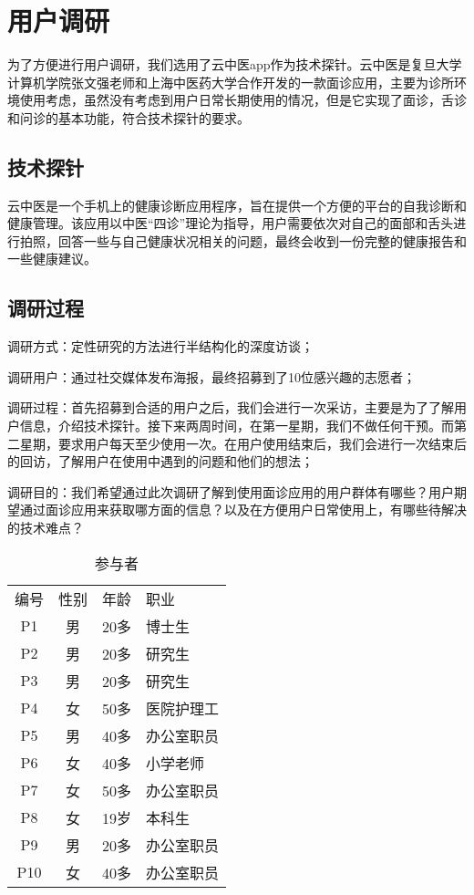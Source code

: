 \chapter{用户调研}
为了方便进行用户调研，我们选用了云中医app作为技术探针。云中医是复旦大学计算机学院张文强老师和上海中医药大学合作开发的一款面诊应用，主要为诊所环境使用考虑，虽然没有考虑到用户日常长期使用的情况，但是它实现了面诊，舌诊和问诊的基本功能，符合技术探针的要求。

\section{技术探针}
云中医是一个手机上的健康诊断应用程序，旨在提供一个方便的平台的自我诊断和健康管理。该应用以中医“四诊”理论为指导，用户需要依次对自己的面部和舌头进行拍照，回答一些与自己健康状况相关的问题，最终会收到一份完整的健康报告和一些健康建议。

\section{调研过程}
 

调研方式：定性研究的方法进行半结构化的深度访谈；

调研用户：通过社交媒体发布海报，最终招募到了10位感兴趣的志愿者；

调研过程：首先招募到合适的用户之后，我们会进行一次采访，主要是为了了解用户信息，介绍技术探针。接下来两周时间，在第一星期，我们不做任何干预。而第二星期，要求用户每天至少使用一次。在用户使用结束后，我们会进行一次结束后的回访，了解用户在使用中遇到的问题和他们的想法；

调研目的：我们希望通过此次调研了解到使用面诊应用的用户群体有哪些？用户期望通过面诊应用来获取哪方面的信息？以及在方便用户日常使用上，有哪些待解决的技术难点？

\begin{table}
  \caption{参与者}
  \centering
  \label{tab:Participants}
  \begin{tabular}{cccl}
编号 &	性别 &	年龄 &	职业 \\

P1 &	男 &	20多 &	博士生 \\
P2 &	男 &	20多 &	研究生 \\
P3 &	男 &	20多 &	研究生 \\
P4 &	女 &	50多 &	医院护理工 \\
P5 &	男 &	40多 &	办公室职员 \\
P6 &	女 &	40多 &	小学老师 \\
P7 &	女 &	50多 &	办公室职员 \\
P8 &	女 &	19岁 &	本科生 \\
P9 &	男 &	20多 &	办公室职员 \\
P10 &	女 &	40多 &	办公室职员 \\
  \end{tabular}
\end{table}

